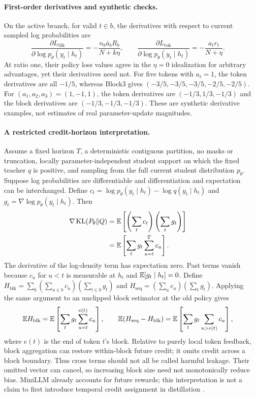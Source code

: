\paragraph{First-order derivatives and synthetic checks.}
On the active branch, for valid $t\in b$, the derivatives with respect to current sampled log probabilities are
\begin{equation}
 \frac{\partial L_{\mathrm{blk}}}{\partial\log p_\theta(y_t\mid h_t)}
 =-\frac{n_b\bar a_bR_b}{N+k\eta},\qquad
 \frac{\partial L_{\mathrm{tok}}}{\partial\log p_\theta(y_t\mid h_t)}
 =-\frac{a_tr_t}{N+\eta}.
\end{equation}
At ratio one, their policy loss values agree in the $\eta=0$ idealization for arbitrary advantages, yet their derivatives need not. For five tokens with $a_t=1$, the token derivatives are all $-1/5$, whereas Block3 gives $(-3/5,-3/5,-3/5,-2/5,-2/5)$. For $(a_1,a_2,a_3)=(1,-1,1)$, the token derivatives are $(-1/3,1/3,-1/3)$ and the block derivatives are $(-1/3,-1/3,-1/3)$. These are synthetic derivative examples, not estimates of real parameter-update magnitudes.

\paragraph{A restricted credit-horizon interpretation.}
Assume a fixed horizon $T$, a deterministic contiguous partition, no masks or truncation, locally parameter-independent student support on which the fixed teacher $q$ is positive, and sampling from the full current student distribution $p_\theta$. Suppose log probabilities are differentiable and differentiation and expectation can be interchanged. Define $c_t=\log p_\theta(y_t\mid h_t)-\log q(y_t\mid h_t)$ and $g_t=\nabla\log p_\theta(y_t\mid h_t)$. Then
\begin{align}
 \nabla\operatorname{KL}(P_\theta\Vert Q)
 &=\mathbb{E}\left[\left(\sum_t c_t\right)\left(\sum_t g_t\right)\right] \\
 &=\mathbb{E}\left[\sum_t g_t\sum_{u=t}^{T}c_u\right].
 \label{eq:fullcredit}
\end{align}
The derivative of the log-density term has expectation zero. Past terms vanish because $c_u$ for $u<t$ is measurable at $h_t$ and $\mathbb{E}[g_t\mid h_t]=0$. Define $H_{\mathrm{blk}}=\sum_b(\sum_{u\in b}c_u)(\sum_{t\in b}g_t)$ and $H_{\mathrm{seq}}=(\sum_u c_u)(\sum_t g_t)$. Applying the same argument to an unclipped block estimator at the old policy gives
\begin{equation}
 \mathbb{E} H_{\mathrm{blk}}=\mathbb{E}\left[\sum_t g_t\sum_{u=t}^{e(t)}c_u\right],\qquad
 \mathbb{E}(H_{\mathrm{seq}}-H_{\mathrm{blk}})=\mathbb{E}\left[\sum_t g_t\sum_{u>e(t)}c_u\right],
 \label{eq:horizon}
\end{equation}
where $e(t)$ is the end of token $t$'s block. Relative to purely local token feedback, block aggregation can restore within-block future credit; it omits credit across a block boundary. Thus cross terms should not all be called harmful leakage. Their omitted vector can cancel, so increasing block size need not monotonically reduce bias. MiniLLM already accounts for future rewards; this interpretation is not a claim to first introduce temporal credit assignment in distillation \citep{minillm}.

